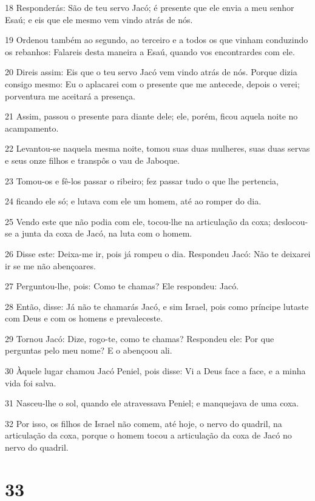\par 18 Responderás: São de teu servo Jacó; é presente que ele envia a meu senhor Esaú; e eis que ele mesmo vem vindo atrás de nós.
\par 19 Ordenou também ao segundo, ao terceiro e a todos os que vinham conduzindo os rebanhos: Falareis desta maneira a Esaú, quando vos encontrardes com ele.
\par 20 Direis assim: Eis que o teu servo Jacó vem vindo atrás de nós. Porque dizia consigo mesmo: Eu o aplacarei com o presente que me antecede, depois o verei; porventura me aceitará a presença.
\par 21 Assim, passou o presente para diante dele; ele, porém, ficou aquela noite no acampamento.
\par 22 Levantou-se naquela mesma noite, tomou suas duas mulheres, suas duas servas e seus onze filhos e transpôs o vau de Jaboque.
\par 23 Tomou-os e fê-los passar o ribeiro; fez passar tudo o que lhe pertencia,
\par 24 ficando ele só; e lutava com ele um homem, até ao romper do dia.
\par 25 Vendo este que não podia com ele, tocou-lhe na articulação da coxa; deslocou-se a junta da coxa de Jacó, na luta com o homem.
\par 26 Disse este: Deixa-me ir, pois já rompeu o dia. Respondeu Jacó: Não te deixarei ir se me não abençoares.
\par 27 Perguntou-lhe, pois: Como te chamas? Ele respondeu: Jacó.
\par 28 Então, disse: Já não te chamarás Jacó, e sim Israel, pois como príncipe lutaste com Deus e com os homens e prevaleceste.
\par 29 Tornou Jacó: Dize, rogo-te, como te chamas? Respondeu ele: Por que perguntas pelo meu nome? E o abençoou ali.
\par 30 Àquele lugar chamou Jacó Peniel, pois disse: Vi a Deus face a face, e a minha vida foi salva.
\par 31 Nasceu-lhe o sol, quando ele atravessava Peniel; e manquejava de uma coxa.
\par 32 Por isso, os filhos de Israel não comem, até hoje, o nervo do quadril, na articulação da coxa, porque o homem tocou a articulação da coxa de Jacó no nervo do quadril.

\chapter{33}

